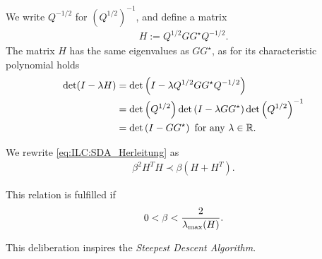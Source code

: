 We write $Q^{-1/2}$ for $\left(Q^{1/2}\right)^{-1}$, and define a matrix 
\begin{align}
H :=  Q^{1/2} G G^\star Q^{-1/2}. 
\end{align}
The matrix $H$ has the same eigenvalues as $G G^{\star}$, as for its characteristic polynomial holds 
\begin{align}
\begin{split}
\det (I - \lambda H) &= \det \left(I - \lambda Q^{1/2} G G^\star Q^{-1/2}\right) \\
&= \det\left(Q^{1/2}\right)\det\left(I - \lambda G G^\star\right) \det\left(Q^{1/2}\right)^{-1} \\
&= \det\left(I - G G^\star\right) \text{ for any } \lambda \in {\mathbb{R}}. 
\end{split}
\end{align}

We rewrite \eqref{eq:ILC:SDA_Herleitung} as 
\begin{align}
\beta^2 H^T H \prec \beta (H + H^T). 
\end{align}

This relation is fulfilled if 
\begin{align}
0 < \beta < \frac{2}{\lambda_{\mathrm{max}}(H)}. 
\end{align}


This deliberation inspires the \textit{Steepest Descent Algorithm}. 


